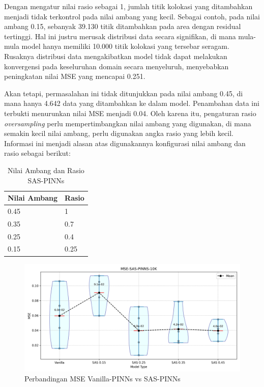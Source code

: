 Dengan mengatur nilai rasio sebagai 1, jumlah titik kolokasi yang ditambahkan menjadi tidak terkontrol pada nilai ambang yang kecil. Sebagai contoh, pada nilai ambang 0.15, sebanyak 39.130 titik ditambahkan pada area dengan residual tertinggi. Hal ini justru merusak distribusi data secara signifikan, di mana mula-mula model hanya memiliki 10.000 titik kolokasi yang tersebar seragam. Rusaknya distribusi data mengakibatkan model tidak dapat melakukan konvergensi pada keseluruhan domain secara menyeluruh, menyebabkan peningkatan nilai MSE yang mencapai 0.251.

Akan tetapi, permasalahan ini tidak ditunjukkan pada nilai ambang 0.45, di mana hanya 4.642 data yang ditambahkan ke dalam model. Penambahan data ini terbukti menurunkan nilai MSE menjadi 0.04. Oleh karena itu, pengaturan rasio \emph{oversampling} perlu mempertimbangkan nilai ambang yang digunakan, di mana semakin kecil nilai ambang, perlu digunakan angka rasio yang lebih kecil. Informasi ini menjadi alasan atas digunakannya konfigurasi nilai ambang dan rasio sebagai berikut:

\begin{table}[htbp]
    \centering
    \begin{threeparttable}
        \caption{Nilai Ambang dan Rasio SAS-PINNs}
        \begin{tabular}{|p{5cm}|p{4cm}|}
				\hline
				Nilai Ambang & Rasio \\
                \hline 
                0.45 & 1\\
                \hline
                0.35 & 0.7 \\
                \hline
                0.25 & 0.4 \\
                \hline
                0.15 & 0.25 \\
                \hline
			\end{tabular}
        \label{SAS-config}
    \end{threeparttable}
\end{table} 

\begin{figure}[htbp]
    \centering
    \includegraphics[width=1 \linewidth]{Gambar/smoteDistribution-All.png}
    \caption{Perbandingan MSE Vanilla-PINNs vs SAS-PINNs}
    \label{fig:Good-SAS-PINNs}
\end{figure}

